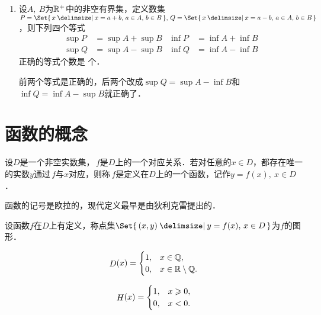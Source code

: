 \begin{enumerate}
\item 设\(A,\ B\)为\(\mathbb{R}^+\)中的非空有界集，定义数集\(P = \Set{\,x \mid x = a + b,\, a \in A,\, b \in B\,},\, Q = \Set{\,x \mid x = a - b,\, a \in A,\, b \in B\,}\)，则下列四个等式
  \begin{align*}
    \sup P &= \sup A + \sup B & \inf P &= \inf A + \inf B \\
    \sup Q &= \sup A - \sup B & \inf Q &= \inf A - \inf B
  \end{align*}
  正确的等式个数是
  \ifshowsol
    \uline{}%
  \else
    \uline{\makebox[4em]{}}%
  \fi
  个．

  \ifshowsol
    前两个等式是正确的，后两个改成\(\sup Q = \sup A - \inf B\)和\(\inf Q = \inf A - \sup B\)就正确了．
  \fi
\end{enumerate}
\fi

\section{函数的概念}

\begin{definition*}
  设\(D\)是一个非空实数集，\(\,f\)是\(D\)上的一个对应关系．若对任意的\(x \in D\)，都存在唯一的实数\(y\)通过\(\,f\)与\(x\)对应，则称\(\,f\)是定义在\(D\)上的一个函数，记作\(y = f(x),\ x \in D\)．
\end{definition*}

函数的记号是欧拉的，现代定义最早是由狄利克雷提出的．

\begin{definition*}
  设函数\(f\)在\(D\)上有定义，称点集\(\Set{\,(x,y) \mid y = f(x),\, x \in D\,}\)为\(f\)的图形．
\end{definition*}

\begin{definition}[狄利克雷函数]
  \label{defn:dirichlet}
  \[
    \mathop{\relax D}\nolimits(x) =
    \begin{cases}
      1, & x \in \mathbb{Q}, \\
      0, & x \in \mathbb{R} \setminus \mathbb{Q}.
    \end{cases}
  \]
\end{definition}

\begin{definition}[单位阶跃函数]
  \label{defn:heaviside}
  \[
    \Fn H(x) =
    \begin{cases}
      1, & x \ge 0, \\
      0, & x < 0.
    \end{cases}
  \]
\end{definition}

